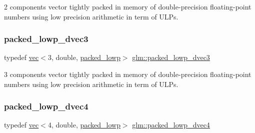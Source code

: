 2 components vector tightly packed in memory of double-\/precision floating-\/point numbers using low precision arithmetic in term of U\+L\+Ps. 

\mbox{\label{group__gtc__type__aligned_ga1e9e7d228165ce69595237084e2c1458}} 
\subsubsection{\texorpdfstring{packed\+\_\+lowp\+\_\+dvec3}{packed\_lowp\_dvec3}}
{\footnotesize\ttfamily typedef \mbox{\hyperlink{structglm_1_1vec}{vec}}$<$3, double, \mbox{\hyperlink{namespaceglm_a36ed105b07c7746804d7fdc7cc90ff25ac36a4bd74559be2c0b65bc48e5953b8b}{packed\+\_\+lowp}}$>$ \mbox{\hyperlink{group__gtc__type__aligned_ga1e9e7d228165ce69595237084e2c1458}{glm\+::packed\+\_\+lowp\+\_\+dvec3}}}



3 components vector tightly packed in memory of double-\/precision floating-\/point numbers using low precision arithmetic in term of U\+L\+Ps. 

\mbox{\label{group__gtc__type__aligned_ga54190c1986b9a3653bf49fddd81e753b}} 
\subsubsection{\texorpdfstring{packed\+\_\+lowp\+\_\+dvec4}{packed\_lowp\_dvec4}}
{\footnotesize\ttfamily typedef \mbox{\hyperlink{structglm_1_1vec}{vec}}$<$4, double, \mbox{\hyperlink{namespaceglm_a36ed105b07c7746804d7fdc7cc90ff25ac36a4bd74559be2c0b65bc48e5953b8b}{packed\+\_\+lowp}}$>$ \mbox{\hyperlink{group__gtc__type__aligned_ga54190c1986b9a3653bf49fddd81e753b}{glm\+::packed\+\_\+lowp\+\_\+dvec4}}}



